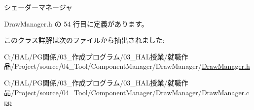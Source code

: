 シェーダーマネージャ 



 Draw\+Manager.\+h の 54 行目に定義があります。



このクラス詳解は次のファイルから抽出されました\+:\begin{DoxyCompactItemize}
\item 
C\+:/\+H\+A\+L/\+P\+G関係/03\+\_\+作成プログラム/03\+\_\+\+H\+A\+L授業/就職作品/\+Project/source/04\+\_\+\+Tool/\+Component\+Manager/\+Draw\+Manager/\mbox{\hyperlink{_draw_manager_8h}{Draw\+Manager.\+h}}\item 
C\+:/\+H\+A\+L/\+P\+G関係/03\+\_\+作成プログラム/03\+\_\+\+H\+A\+L授業/就職作品/\+Project/source/04\+\_\+\+Tool/\+Component\+Manager/\+Draw\+Manager/\mbox{\hyperlink{_draw_manager_8cpp}{Draw\+Manager.\+cpp}}\end{DoxyCompactItemize}
